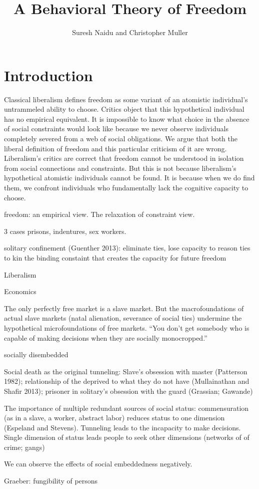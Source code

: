 \documentclass[10pt,a4paper]{article}
\title{A Behavioral Theory of Freedom}
\author{Suresh Naidu and Christopher Muller}
\begin{document}
\maketitle

\begin{abstract}
\end{abstract}

\setcounter{page}{0}
\thispagestyle{empty}

\renewcommand{\baselinestretch}{1.4}\large\normalsize

\section*{Introduction}

\noindent Classical liberalism defines freedom as some variant of an atomistic individual's untrammeled ability to choose. Critics object that this hypothetical individual has no empirical equivalent. It is impossible to know what choice in the absence of social constraints would look like because we never observe individuals completely severed from a web of social obligations. We argue that both the liberal definition of freedom and this particular criticism of it are wrong. Liberalism's critics are correct that freedom cannot be understood in isolation from social connections and constraints. But this is not because liberalism's hypothetical atomistic individuals cannot be found. It is because when we do find them, we confront individuals who fundamentally lack the cognitive capacity to choose. 

freedom: an empirical view. The relaxation of constraint view.

3 cases
prisons, indentures, sex workers.

solitary confinement (Guenther 2013): eliminate ties, lose capacity to reason
ties to kin the binding constaint that creates the capacity for future freedom

Liberalism



Economics
 
 The only perfectly free market is a slave market. But the macrofoundations of actual slave markets 
 (natal alienation, severance of social ties) undermine the hypothetical microfoundations of free markets. 
 ``You don't get somebody who is capable of making decisions when they are socially monocropped.''
 
 socially disembedded
 
 Social death as the original tunneling: Slave's obsession with master (Patterson 1982); 
 relationship of the deprived to what they do not have (Mullainathan and Shafir 2013); prisoner 
 in solitary's obsession with the guard (Grassian; Gawande)
 
 The importance of multiple redundant sources of social status: commensuration (as in a slave, a worker, 
 abstract labor) reduces status to one dimension (Espeland and Stevens). Tunneling leads to the incapacity 
 to make decisions. Single dimension of status leads people to seek other dimensions (networks of 
 of crime; gangs) 
 
 We can observe the effects of social embeddedness negatively. 
 
 Graeber: fungibility of persons
 
\end{document}
